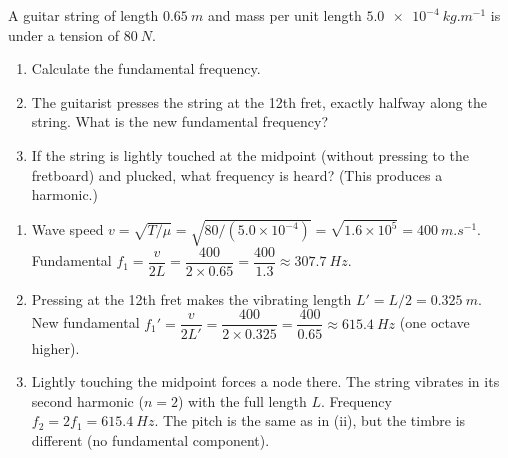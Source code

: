 \documentclass[11pt]{article}
\begin{document}
\begin{exoresolu}
A guitar string of length $\SI{0.65}{m}$ and mass per unit length $\SI{5.0e-4}{kg.m^{-1}}$ is under a tension of $\SI{80}{N}$.
\begin{enumerate}
\item Calculate the fundamental frequency.
\item The guitarist presses the string at the 12th fret, exactly halfway along the string. What is the new fundamental frequency?
\item If the string is lightly touched at the midpoint (without pressing to the fretboard) and plucked, what frequency is heard? (This produces a harmonic.)
\end{enumerate}
\tcblower
\begin{enumerate}
\item Wave speed $v = \sqrt{T/\mu} = \sqrt{80 / (5.0\times10^{-4})} = \sqrt{1.6\times10^5} = \SI{400}{m.s^{-1}}$.
  Fundamental $f_1 = \dfrac{v}{2L} = \dfrac{400}{2 \times 0.65} = \dfrac{400}{1.3} \approx \SI{307.7}{Hz}$.
\item Pressing at the 12th fret makes the vibrating length $L' = L/2 = \SI{0.325}{m}$. New fundamental $f_1' = \dfrac{v}{2L'} = \dfrac{400}{2 \times 0.325} = \dfrac{400}{0.65} \approx \SI{615.4}{Hz}$ (one octave higher).
\item Lightly touching the midpoint forces a node there. The string vibrates in its second harmonic ($n=2$) with the full length $L$. Frequency $f_2 = 2 f_1 = \SI{615.4}{Hz}$. The pitch is the same as in (ii), but the timbre is different (no fundamental component).
\end{enumerate}
\end{exoresolu}
\end{document}
